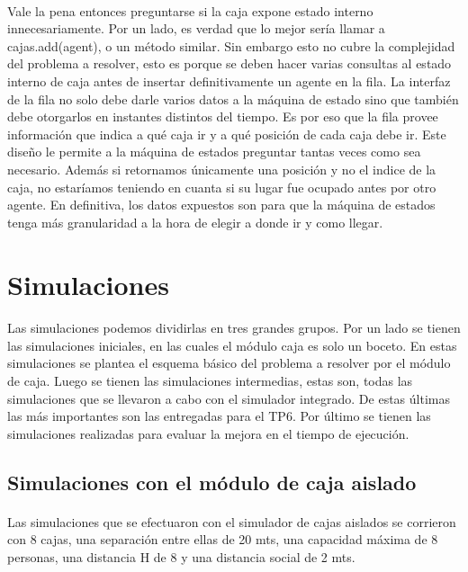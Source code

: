 \documentclass{article}
\begin{document}
\paragraph{}
Vale la pena entonces preguntarse si la caja expone estado interno innecesariamente. Por un lado, es verdad que lo mejor sería llamar a cajas.add(agent), o un método similar. Sin embargo esto no cubre la complejidad del problema a resolver, esto es porque se deben hacer varias consultas al estado interno de caja antes de insertar definitivamente un agente en la fila. La interfaz de la fila no solo debe darle varios datos a la máquina de estado sino que también debe otorgarlos en instantes distintos del tiempo. Es por eso que la fila provee información que indica a qué caja ir y a qué posición de cada caja debe ir. Este diseño le permite a la máquina de estados preguntar tantas veces como sea necesario. Además si retornamos únicamente una posición y no el indice de la caja, no estaríamos teniendo en cuanta si su lugar fue ocupado antes por otro agente. En definitiva, los datos expuestos son para que la máquina de estados tenga más granularidad a la hora de elegir a donde ir y como llegar.

\section{Simulaciones}

\paragraph{}
Las simulaciones podemos dividirlas en tres grandes grupos. Por un lado se tienen las simulaciones iniciales, en las cuales el módulo caja es solo un boceto. En estas simulaciones se plantea el esquema básico del problema a resolver por el módulo de caja. Luego se tienen las simulaciones intermedias, estas son, todas las simulaciones que se llevaron a cabo con el simulador integrado. De estas últimas las más importantes son las entregadas para el TP6. Por último se tienen las simulaciones realizadas para evaluar la mejora en el tiempo de ejecución.

\subsection{Simulaciones con el módulo de caja aislado}

\paragraph{}
Las simulaciones que se efectuaron con el simulador de cajas aislados se corrieron con 8 cajas, una separación entre ellas de 20 mts, una capacidad máxima de 8 personas, una distancia H de 8 y una distancia social de 2 mts.
\end{document}
